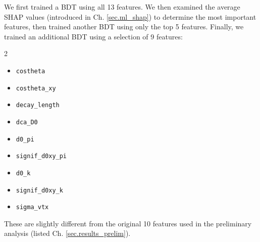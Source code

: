 We first trained a BDT using all 13 features. We then examined the average SHAP values (introduced in Ch. \ref{sec.ml_shap}) to determine the most important features, then trained another BDT using only the top 5 features. Finally, we trained an additional BDT using a selection of 9 features:
\begin{multicols}{2}
\begin{itemize}
    \item \texttt{costheta}
    \item \texttt{costheta\_xy}
    \item \texttt{decay\_length}
    \item \texttt{dca\_D0}
    \item \texttt{d0\_pi}
    \item \texttt{signif\_d0xy\_pi}
    \item \texttt{d0\_k}
    \item \texttt{signif\_d0xy\_k}
    \item \texttt{sigma\_vtx}
\end{itemize}
\end{multicols}
These are slightly different from the original 10 features used in the preliminary analysis (listed Ch. \ref{sec.results_prelim}).

%
%


